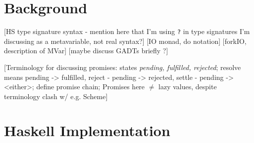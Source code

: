 \documentclass[12pt, english, letterpaper]{kuthesis}
\newcommand{\lit}[1]{\texttt{#1}}
\begin{document}
\section{Background}
[HS type signature syntax - mention here that I'm using \lit ? in type signatures I'm discussing as a metavariable, not real syntax?]
[IO monad, do notation]
[forkIO, description of MVar]
[maybe discuss GADTs briefly ?]

[Terminology for discussing promises: states \emph{pending, fulfilled, rejected}; resolve means pending -> fulfilled, reject - pending -> rejected, settle - pending -> <either>; define promise chain; Promises here $\neq$ lazy values, despite terminology clash w/ e.g. Scheme]

\section{Haskell Implementation}
\end{document}
